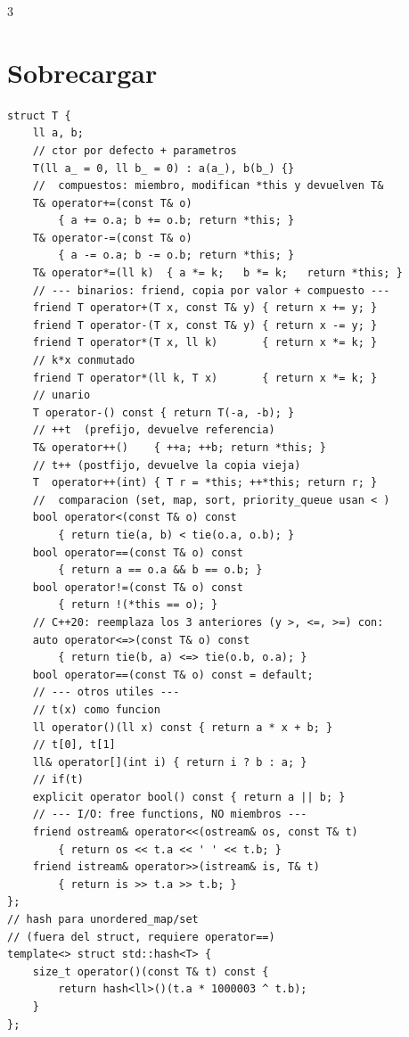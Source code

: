 \documentclass[8pt, spanish, mexico, letterpaper]{extarticle}
\newcommand{\<}{<}
\begin{document}
\begin{multicols*}{3}
\section{Sobrecargar}
\begin{verbatim}
struct T {
    ll a, b;
    // ctor por defecto + parametros
    T(ll a_ = 0, ll b_ = 0) : a(a_), b(b_) {}          
    //  compuestos: miembro, modifican *this y devuelven T& 
    T& operator+=(const T& o) 
        { a += o.a; b += o.b; return *this; }
    T& operator-=(const T& o) 
        { a -= o.a; b -= o.b; return *this; }
    T& operator*=(ll k)  { a *= k;   b *= k;   return *this; }
    // --- binarios: friend, copia por valor + compuesto ---
    friend T operator+(T x, const T& y) { return x += y; }
    friend T operator-(T x, const T& y) { return x -= y; }
    friend T operator*(T x, ll k)       { return x *= k; }
    // k*x conmutado
    friend T operator*(ll k, T x)       { return x *= k; }  
    // unario
    T operator-() const { return T(-a, -b); }   
    // ++t  (prefijo, devuelve referencia)
    T& operator++()    { ++a; ++b; return *this; }   
    // t++ (postfijo, devuelve la copia vieja)
    T  operator++(int) { T r = *this; ++*this; return r; } 
    //  comparacion (set, map, sort, priority_queue usan < ) 
    bool operator<(const T& o) const 
        { return tie(a, b) < tie(o.a, o.b); }
    bool operator==(const T& o) const 
        { return a == o.a && b == o.b; }
    bool operator!=(const T& o) const 
        { return !(*this == o); }
    // C++20: reemplaza los 3 anteriores (y >, <=, >=) con:
    auto operator<=>(const T& o) const 
        { return tie(b, a) <=> tie(o.b, o.a); }
    bool operator==(const T& o) const = default;   
    // --- otros utiles ---
    // t(x) como funcion
    ll operator()(ll x) const { return a * x + b; }         
    // t[0], t[1]
    ll& operator[](int i) { return i ? b : a; }             
    // if(t)
    explicit operator bool() const { return a || b; }       
    // --- I/O: free functions, NO miembros ---
    friend ostream& operator<<(ostream& os, const T& t) 
        { return os << t.a << ' ' << t.b; }
    friend istream& operator>>(istream& is, T& t)       
        { return is >> t.a >> t.b; }
};
// hash para unordered_map/set 
// (fuera del struct, requiere operator==)
template<> struct std::hash<T> {
    size_t operator()(const T& t) const { 
        return hash<ll>()(t.a * 1000003 ^ t.b); 
    }
};
\end{verbatim}



\clearpage

\end{multicols*}
\end{document}
